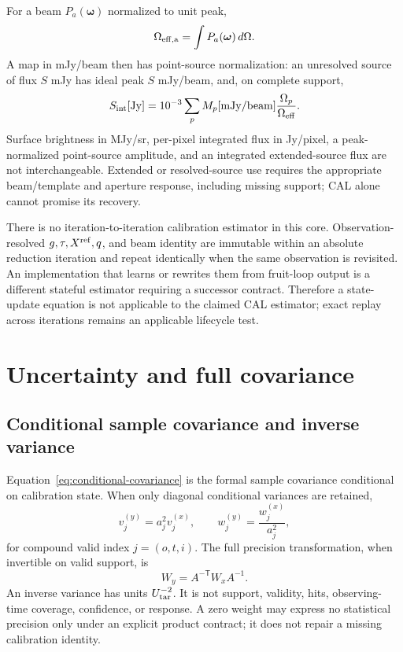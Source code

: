 \documentclass[11pt]{article}
\begin{document}
For a beam \(P_a(\boldsymbol\omega)\) normalized to unit peak,
\begin{equation}
 \Omega_{\rm eff,a}=\int P_a(\boldsymbol\omega)\,d\Omega.
 \label{eq:beam-solid-angle}
\end{equation}
A map in mJy/beam then has point-source normalization: an unresolved source of
flux \(S\) mJy has ideal peak \(S\) mJy/beam, and, on complete support,
\begin{equation}
 S_{\rm int}[\mathrm{Jy}]=10^{-3}\sum_p
 M_p[\mathrm{mJy/beam}]\frac{\Omega_p}{\Omega_{\rm eff}}.
 \label{eq:integrated-flux}
\end{equation}
Surface brightness in MJy/sr, per-pixel integrated flux in Jy/pixel, a
peak-normalized point-source amplitude, and an integrated extended-source flux
are not interchangeable.  Extended or resolved-source use requires the
appropriate beam/template and aperture response, including missing support;
CAL alone cannot promise its recovery.

There is no iteration-to-iteration calibration estimator in this core.
Observation-resolved \(g,\tau,X^{\rm ref},q\), and beam identity are immutable
within an absolute reduction iteration and repeat identically when the same
observation is revisited.  An implementation that learns or rewrites them from
fruit-loop output is a different stateful estimator requiring a successor
contract.  Therefore a state-update equation is not applicable to the claimed
CAL estimator; exact replay across iterations remains an applicable lifecycle
test.

\section{Uncertainty and full covariance}

\subsection{Conditional sample covariance and inverse variance}

Equation~\eqref{eq:conditional-covariance} is the formal sample covariance
conditional on calibration state.  When only diagonal conditional variances
are retained,
\begin{equation}
 v^{(y)}_j=a_j^2v^{(x)}_j,
 \qquad
 w^{(y)}_j=\frac{w^{(x)}_j}{a_j^2},
 \label{eq:variance-weight-transfer}
\end{equation}
for compound valid index \(j=(o,t,i)\).  The full precision transformation,
when invertible on valid support, is
\begin{equation}
 W_y=A^{-\mathsf T}W_xA^{-1}.
 \label{eq:precision-transfer}
\end{equation}
An inverse variance has units \(U_{\rm tar}^{-2}\).  It is not support,
validity, hits, observing-time coverage, confidence, or response.  A zero
weight may express no statistical precision only under an explicit product
contract; it does not repair a missing calibration identity.
\end{document}

